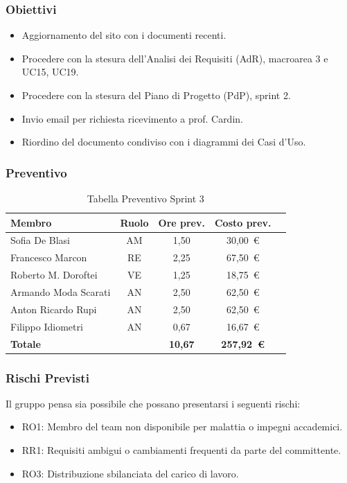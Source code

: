 \subsubsection{Obiettivi}
\begin{itemize}
    \item Aggiornamento del sito con i documenti recenti.
    \item Procedere con la stesura dell'Analisi dei Requisiti (AdR), macroarea 3 e UC15, UC19.
    \item Procedere con la stesura del Piano di Progetto (PdP), sprint 2.
    \item Invio email per richiesta ricevimento a prof. Cardin.
    \item Riordino del documento condiviso con i diagrammi dei Casi d'Uso.
\end{itemize}

\subsubsection{Preventivo}
\begin{table}[H]
    \centering
    \renewcommand{\arraystretch}{1.3}
    \begin{tabularx}{\textwidth}{|X|c|c|c|r|}
        \hline
        \textbf{Membro} & \textbf{Ruolo} & \textbf{Ore prev.} & \textbf{Costo prev.} \\
        \hline
        Sofia De Blasi           & AM & 1,50 & 30{,}00~\euro \\
        Francesco Marcon         & RE & 2,25 & 67{,}50~\euro \\
        Roberto M. Doroftei      & VE & 1,25 & 18{,}75~\euro \\
        Armando Moda Scarati     & AN & 2,50 & 62{,}50~\euro \\
        Anton Ricardo Rupi       & AN & 2,50 & 62{,}50~\euro \\
        Filippo Idiometri        & AN & 0,67 & 16{,}67~\euro \\
        \hline
        \textbf{Totale}          &    & \textbf{10,67} &
        \textbf{257{,}92~\euro} \\
        \hline
    \end{tabularx}
    \caption{Tabella Preventivo Sprint 3} 
\end{table}

\subsubsection{Rischi Previsti}
Il gruppo pensa sia possibile che possano presentarsi i seguenti rischi:
\begin{itemize}
    \item RO1: Membro del team non disponibile per malattia o impegni accademici.
    \item RR1: Requisiti ambigui o cambiamenti frequenti da parte del committente.
    \item RO3: Distribuzione sbilanciata del carico di lavoro.
\end{itemize}

